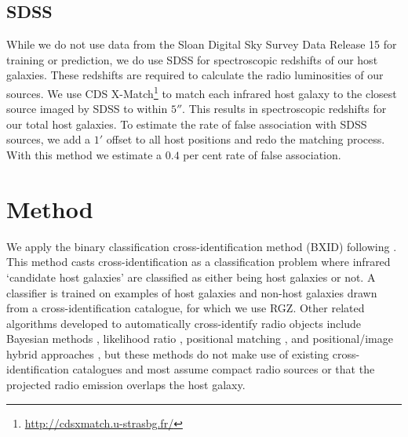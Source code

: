     \subsection{SDSS} \label{sec:rlfs-sdss-data}

    While we do not use data from the Sloan Digital Sky Survey Data Release 15 \citep[SDSS;][]{sdss} for training or prediction, we do use SDSS for spectroscopic redshifts of our host galaxies. These redshifts are required to calculate the radio luminosities of our sources. We use CDS X-Match\footnote{\url{http://cdsxmatch.u-strasbg.fr/}} to match each infrared host galaxy to the closest source imaged by SDSS to within $5''$. This results in \nsourceszsp{} spectroscopic redshifts for our \nsources{} total host galaxies. To estimate the rate of false association with SDSS sources, we add a $1'$ offset to all host positions and redo the matching process. With this method we estimate a $0.4$ per cent rate of false association.

\section{Method}\label{sec:rlfs-method}
    
We apply the binary classification cross-identification method (BXID) following \citet{alger18radio}. This method casts cross-identification
as a classification problem where infrared `candidate host galaxies' are
classified as either being host galaxies or not. A classifier is trained
on examples of host galaxies and non-host galaxies drawn from a
cross-identification catalogue, for which we use RGZ. Other related
algorithms developed to automatically cross-identify radio objects
include Bayesian methods \citep{fan15}, likelihood ratio \citep{weston18lrpy},
 positional matching \citep[e.g.][]{kimball08, norris06, middelberg08}, and positional/image hybrid approaches \citep{van_velzen_radio_2012}, but these methods do not make use of existing
cross-identification catalogues and most assume compact radio sources or that the projected radio emission overlaps the host galaxy.


